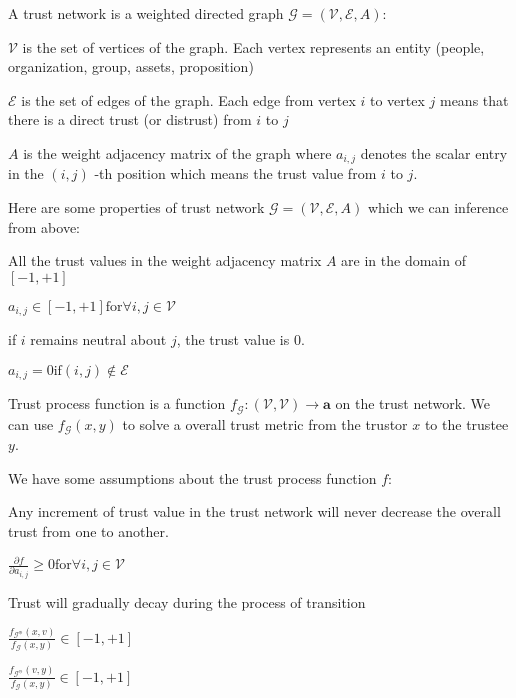 \documentclass{article}
\begin{document}

A trust network is a weighted directed graph \(\mathcal{G}=(\mathcal{V},\mathcal{E},A)\):


\item \(\mathcal{V}\) is the set of vertices of the graph. Each vertex represents an entity (people, organization, group, assets, proposition)


\item \(\mathcal{E}\) is the set of edges of the graph. Each edge from vertex \(i\) to vertex \(j\) means that there is a direct trust (or distrust)
from \(i\) to \(j\)


\item \(A\) is the weight adjacency matrix of the graph where \(a_{i,j}\) denotes the scalar entry in the \((i,j)\) -th position which means the
trust value from \(i\) to \(j\).



Here are some properties of trust network \(\mathcal{G}=(\mathcal{V},\mathcal{E},A)\) which we can inference from above:

All the trust values in the weight adjacency matrix \(A\) are in the domain of \([-1,+1]\)

\(a_{i,j}\in [-1,+1] \text{for} \forall i,j\in \mathcal{V}\)

if \(i\) remains neutral about \(j\), the trust value is \(0\).

\(a_{i,j}=0 \text{if} (i,j)\notin \mathcal{E}\)



Trust process function is a function \(f_{\mathcal{G}}:(\mathcal{V},\mathcal{V})\to \mathbf{a}\) on the trust network. We can use \(f_{\mathcal{G}}(x,y)\)
to solve a overall trust metric from the trustor \(x\) to the trustee \(y\).



We have some assumptions about the trust process function \(f\):

Any increment of trust value in the trust network will never decrease the overall trust from one to another.

\(\frac{\partial f}{\partial a_{i,j}}\geqslant 0 \text{for} \forall i,j\in \mathcal{V}\)

Trust will gradually decay during the process of transition

\(\frac{f_{\mathcal{G}^{\oplus }}(x,v)}{f_{\mathcal{G}}(x,y)}\in [-1,+1]\)

\(\frac{f_{\mathcal{G}^{\ominus }}(v,y)}{f_{\mathcal{G}}(x,y)}\in [-1,+1]\)
\end{document}
